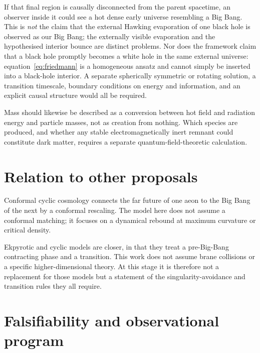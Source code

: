 \documentclass[a4paper,11pt]{article}
\begin{document}
If that final region is causally disconnected from the parent spacetime, an observer inside it could see a hot dense early universe resembling a Big Bang. This is \emph{not} the claim that the external Hawking evaporation of one black hole is observed as our Big Bang; the externally visible evaporation and the hypothesised interior bounce are distinct problems. Nor does the framework claim that a black hole promptly becomes a white hole in the same external universe: equation~\eqref{eq:friedmann} is a homogeneous ansatz and cannot simply be inserted into a black-hole interior. A separate spherically symmetric or rotating solution, a transition timescale, boundary conditions on energy and information, and an explicit causal structure would all be required.

Mass should likewise be described as a conversion between hot field and radiation energy and particle masses, not as creation from nothing. Which species are produced, and whether any stable electromagnetically inert remnant could constitute dark matter, requires a separate quantum-field-theoretic calculation.

\section{Relation to other proposals}

Conformal cyclic cosmology connects the far future of one aeon to the Big Bang of the next by a conformal rescaling. The model here does not assume a conformal matching; it focuses on a dynamical rebound at maximum curvature or critical density.

Ekpyrotic and cyclic models are closer, in that they treat a pre-Big-Bang contracting phase and a transition. This work does not assume brane collisions or a specific higher-dimensional theory. At this stage it is therefore not a replacement for those models but a statement of the singularity-avoidance and transition rules they all require.

\section{Falsifiability and observational program}
\label{sec:falsify}
\end{document}
